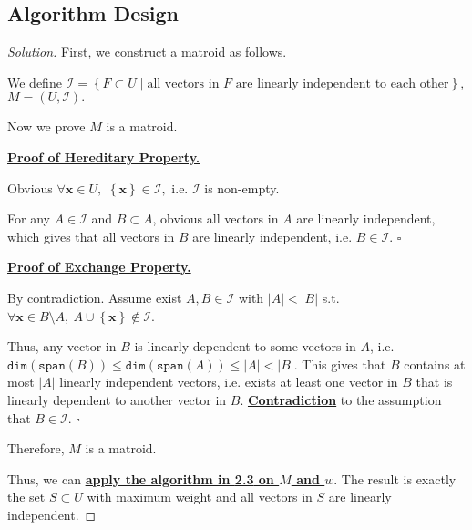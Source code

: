 \documentclass{article}
\newcommand{\whiteqed}{\hfill $\square$\par}
\newcommand{\set}[1]{\left\{#1\right\}}
\newenvironment{solution}{\begin{proof}[\noindent\it Solution]}{\end{proof}}
\begin{document}
\subsection{Algorithm Design}
\vspace{1em}
\begin{solution}
    First, we construct a matroid as follows. 
    
    \hspace{2.6em}
    We define $\mathcal{I}=\set{F\subset U\mid\text{all vectors in }F\text{ are linearly independent to each other}}$, $M=(U,\mathcal{I}).$
    
    \vspace{1em} \hspace{2.6em}
    Now we prove $M$ is a matroid.
    
    \hspace{-2em}
    \underline{\textbf{Proof of Hereditary Property.}} 
    
    \hspace{2.6em}
    Obvious $\forall \mathbf{x}\in U,$ $\set{\mathbf{x}}\in\mathcal{I},$ i.e. $\mathcal{I}$ is non-empty. 
    
    \hspace{2.6em}
    For any $A\in\mathcal{I}$ and $B\subset A$, obvious all vectors in $A$ are linearly independent, which gives that all vectors in $B$ are linearly independent, i.e. $B\in\mathcal{I}.$ \whiteqed
    
    \vspace{1em}\hspace{-2em}
    \underline{\textbf{Proof of Exchange Property.}}
    
    \hspace{2.6em}
    By contradiction. Assume exist $A,B\in\mathcal{I}$ with $|A|<|B|$ s.t. $\forall \mathbf{x}\in B\setminus A,\ A\cup\set{\mathbf{x}}\notin\mathcal{I}$. 
    
    \hspace{2.6em}
    Thus, any vector in $B$ is linearly dependent to some vectors in $A$,
    i.e. $\mathtt{dim}\left(\mathtt{span}(B)\right)\le\mathtt{dim}\left(\mathtt{span}(A)\right)\le|A|<|B|.$ This gives that $B$ contains at most $|A|$ linearly independent vectors, i.e. exists at least one vector in $B$ that is linearly dependent to another vector in $B$. \underline{\textbf{Contradiction}} to the assumption that $B\in\mathcal{I}.$ \whiteqed
    
    \vspace{1em} \hspace{1em}
    Therefore, $M$ is a matroid.
    
    \hspace{1em}
    Thus, we can \underline{\textbf{apply the algorithm in \textbf{2.3} on $M$ and $w$}}. The result is exactly the set $S\subset U$ with maximum weight and all vectors in $S$ are linearly independent.
\end{solution}
\end{document}
